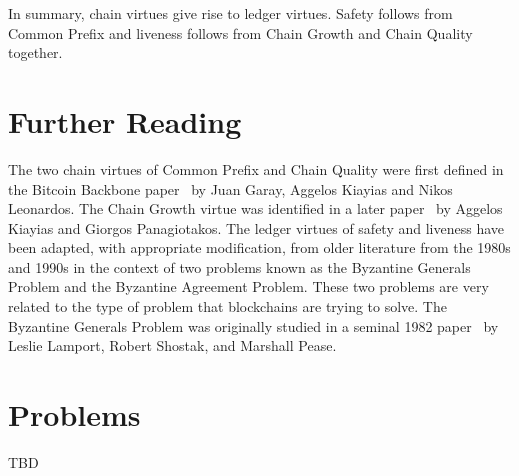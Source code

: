 In summary, chain virtues give rise to ledger virtues. Safety follows from Common Prefix
and liveness follows from Chain Growth and Chain Quality together.

\section{Further Reading}
The two chain virtues of Common Prefix and Chain Quality were first defined in the Bitcoin Backbone paper~\cite{backbone}
by Juan Garay, Aggelos Kiayias and Nikos Leonardos. The Chain Growth virtue was identified in a later paper~\cite{speedsecurity}
by Aggelos Kiayias and Giorgos Panagiotakos. The ledger virtues of safety and liveness have been adapted, with appropriate
modification, from older literature from the 1980s and 1990s in the context of two problems known as the Byzantine Generals
Problem and the Byzantine Agreement Problem. These two problems are very related to the type of problem that blockchains
are trying to solve. The Byzantine Generals Problem was originally studied in a seminal 1982 paper~\cite{lamport} by Leslie Lamport,
Robert Shostak, and Marshall Pease.

\section{Problems}

TBD
